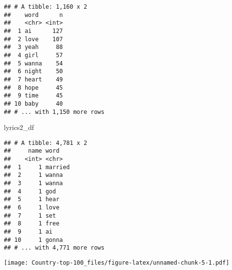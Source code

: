 \documentclass[]{article}
\newenvironment{Shaded}{\begin{snugshade}}{\end{snugshade}}
\newcommand{\DataTypeTok}[1]{\textcolor[rgb]{0.13,0.29,0.53}{#1}}
\newcommand{\DecValTok}[1]{\textcolor[rgb]{0.00,0.00,0.81}{#1}}
\newcommand{\KeywordTok}[1]{\textcolor[rgb]{0.13,0.29,0.53}{\textbf{#1}}}
\newcommand{\NormalTok}[1]{#1}
\newcommand{\OperatorTok}[1]{\textcolor[rgb]{0.81,0.36,0.00}{\textbf{#1}}}
\newcommand{\OtherTok}[1]{\textcolor[rgb]{0.56,0.35,0.01}{#1}}
\newcommand{\StringTok}[1]{\textcolor[rgb]{0.31,0.60,0.02}{#1}}
\begin{document}
\begin{Shaded}
\end{Shaded}

\begin{verbatim}
## # A tibble: 1,160 x 2
##    word      n
##    <chr> <int>
##  1 ai      127
##  2 love    107
##  3 yeah     88
##  4 girl     57
##  5 wanna    54
##  6 night    50
##  7 heart    49
##  8 hope     45
##  9 time     45
## 10 baby     40
## # ... with 1,150 more rows
\end{verbatim}

\begin{Shaded}
\begin{Highlighting}[]
\NormalTok{lyrics2_df}
\end{Highlighting}
\end{Shaded}

\begin{verbatim}
## # A tibble: 4,781 x 2
##     name word   
##    <int> <chr>  
##  1     1 married
##  2     1 wanna  
##  3     1 wanna  
##  4     1 god    
##  5     1 hear   
##  6     1 love   
##  7     1 set    
##  8     1 free   
##  9     1 ai     
## 10     1 gonna  
## # ... with 4,771 more rows
\end{verbatim}

\begin{Shaded}
\end{Shaded}

\texttt{[image: Country-top-100\_files/figure-latex/unnamed-chunk-5-1.pdf]}
\end{document}
